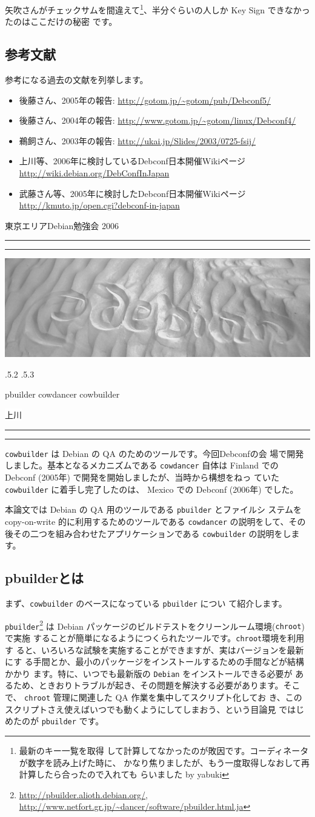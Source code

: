 \documentclass[mingoth,a4paper]{jsarticle}
\makeatletter
\renewcommand{\section}{\@startsection{section}{1}{\z@}%
    {\Cvs \@plus.5\Cdp \@minus.2\Cdp}%
    {.5\Cvs \@plus.3\Cdp}%
    {\normalfont\Huge\headfont\raggedright\centering}} %
\newcommand{\dancersection}[2]{%
\newpage
東京エリアDebian勉強会 2006
\hrule
\vspace{0.5mm}
\hrule
\hfill{}\includegraphics[width=16cm]{image2006-natsu/guruguru-sand-light.png}\\
\vspace{-5cm}
\begin{center}
\section{#1}
\end{center}
\hfill{}\colorbox{white}{#2}\hspace{3cm}\space\\
\vspace{1cm}
\hrule
\vspace{0.5mm}
\hrule
\vspace{1cm}
}
\makeatother
\begin{document}
矢吹さんがチェックサムを間違えて\footnote{最新のキー一覧を取得
して計算してなかったのが敗因です。コーディネータが数字を読み上げた時に、
かなり焦りましたが、もう一度取得しなおして再計算したら合ったので入れても
らいました by yabuki}、半分ぐらいの人しか Key Sign できなかったのはここだけの秘密
です。

\subsection{参考文献}

参考になる過去の文献を列挙します。

\begin{itemize}
 \item 後藤さん、2005年の報告: \url{http://gotom.jp/~gotom/pub/Debconf5/}
 \item 後藤さん、2004年の報告: \url{http://www.gotom.jp/~gotom/linux/Debconf4/}
 \item 鵜飼さん、2003年の報告: \url{http://ukai.jp/Slides/2003/0725-fsij/}
 \item 上川等、2006年に検討しているDebconf日本開催Wikiページ \url{http://wiki.debian.org/DebConfInJapan}
 \item 武藤さん等、2005年に検討したDebconf日本開催Wikiページ \url{http://kmuto.jp/open.cgi?debconf-in-japan}
\end{itemize}

\dancersection{pbuilder cowdancer cowbuilder}{上川}

\texttt{cowbuilder} は Debian の QA のためのツールです。今回Debconfの会
場で開発しました。基本となるメカニズムである \texttt{cowdancer} 自体は 
Finland での Debconf (2005年) で開発を開始しましたが、当時から構想をねっ
ていた \texttt{cowbuilder} に着手し完了したのは、 Mexico での Debconf
(2006年) でした。

本論文では Debian の QA 用のツールである \texttt{pbuilder} とファイルシ
ステムをcopy-on-write 的に利用するためのツールである \texttt{cowdancer} 
の説明をして、その後その二つを組み合わせたアプリケーションである 
\texttt{cowbuilder} の説明をします。

\subsection{pbuilderとは}

まず、\texttt{cowbuilder} のベースになっている \texttt{pbuilder} につい
て紹介します。

\texttt{pbuilder}\footnote{\url{http://pbuilder.alioth.debian.org/},
\url{http://www.netfort.gr.jp/~dancer/software/pbuilder.html.ja}} は 
Debian パッケージのビルドテストをクリーンルーム環境({\tt chroot})で実施
することが簡単になるようにつくられたツールです。{\tt chroot}環境を利用す
ると、いろいろな試験を実施することができますが、実はバージョンを最新にす
る手間とか、最小のパッケージをインストールするための手間などが結構かかり
ます。特に、いつでも最新版の \texttt{Debian} をインストールできる必要が
あるため、ときおりトラブルが起き、その問題を解決する必要があります。そこ
で、 \texttt{chroot} 管理に関連した QA 作業を集中してスクリプト化してお
き、このスクリプトさえ使えばいつでも動くようにしてしまおう、という目論見
ではじめたのが \texttt{pbuilder} です。
\end{document}
